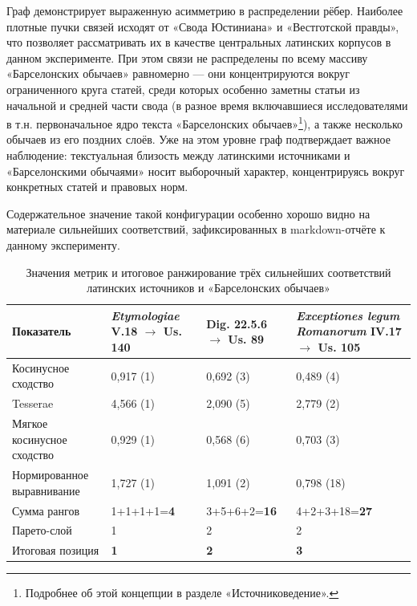Граф демонстрирует выраженную асимметрию в распределении рёбер. Наиболее плотные пучки связей исходят от «Свода Юстиниана» и «Вестготской правды», что позволяет рассматривать их в качестве центральных латинских корпусов в данном эксперименте. При этом связи не распределены по всему массиву «Барселонских обычаев» равномерно --- они концентрируются вокруг ограниченного круга статей, среди которых особенно заметны статьи из начальной и средней части свода (в разное время включавшиеся исследователями в т.н. первоначальное ядро текста «Барселонских обычаев»\footnote{Подробнее об этой концепции в разделе «Источниковедение».}), а также несколько обычаев из его поздних слоёв. Уже на этом уровне граф подтверждает важное наблюдение: текстуальная близость между латинскими источниками и «Барселонскими обычаями» носит выборочный характер, концентрируясь вокруг конкретных статей и правовых норм.

Содержательное значение такой конфигурации особенно хорошо видно на материале сильнейших соответствий, зафиксированных в markdown-отчёте к данному эксперименту.

\begin{center}
\small
\setlength{\tabcolsep}{2pt}
\begin{longtable}{|p{}|p{}|p{}|p{}|}
\caption{Значения метрик и итоговое ранжирование трёх сильнейших соответствий латинских источников и «Барселонских обычаев»}\label{tab:ch1-latin-ranking}\\
\hline
\textbf{Показатель} & \textbf{\emph{Etymologiae} V.18 $\rightarrow$ Us. 140} & \textbf{Dig. 22.5.6 $\rightarrow$ Us. 89} & \textbf{\emph{Exceptiones legum Romanorum} IV.17 $\rightarrow$ Us. 105} \\ \hline
Косинусное сходство & 0,917 (1) & 0,692 (3) & 0,489 (4) \\ \hline
Tesserae & 4,566 (1) & 2,090 (5) & 2,779 (2) \\ \hline
Мягкое косинусное сходство & 0,929 (1) & 0,568 (6) & 0,703 (3) \\ \hline
Нормированное выравнивание & 1,727 (1) & 1,091 (2) & 0,798 (18) \\ \hline
Сумма рангов & 1+1+1+1=\textbf{4} & 3+5+6+2=\textbf{16} & 4+2+3+18=\textbf{27} \\ \hline
Парето-слой & 1 & 2 & 2 \\ \hline
Итоговая позиция & \textbf{1} & \textbf{2} & \textbf{3} \\ \hline
\end{longtable}
\end{center}

